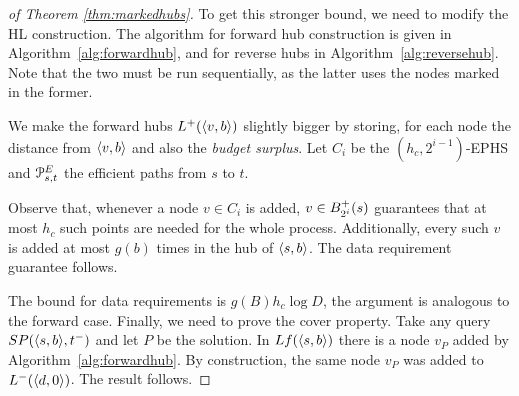 \begin{proof}[of Theorem \ref{thm:markedhubs}]
	To get this stronger bound, we need to modify the HL construction. The algorithm for forward hub construction is given in Algorithm~\ref{alg:forwardhub}, and for reverse hubs in Algorithm~\ref{alg:reversehub}. Note that the two must be run sequentially, as the latter uses the nodes marked in the former.
	
	
	We make the forward hubs $L^+(\langle v,b\rangle)$ slightly bigger by storing, for each node the distance from $\langle v,b\rangle$ and also the \emph{budget surplus}.
	Let $C_i$ be the $(h_c,2^{i-1})$-EPHS and $\mathcal{P}^E_{s,t}$ the efficient paths from $s$ to $t$.
	
	Observe that, whenever a node $v\in C_i$ is added, $v\in B^+_{2^i}(s)$ guarantees that at most $h_c$ such points are needed for the whole process.
	Additionally, every such $v$ is added at most $g(b)$ times in the hub of $\langle s,b\rangle$.
	The data requirement guarantee follows.
	
	The bound for data requirements is $g(B) h_c\log D$, the argument is analogous to the forward case.
	Finally, we need to prove the cover property.
	Take any query $SP(\langle s,b\rangle,t^-)$ and let $P$ be the solution.
	In $Lf(\langle s,b\rangle)$ there is a node $v_P$ added by Algorithm~\ref{alg:forwardhub}.
	By construction, the same node $v_P$ was added to $L^-(\langle d,0\rangle)$. The result follows.
\end{proof}

